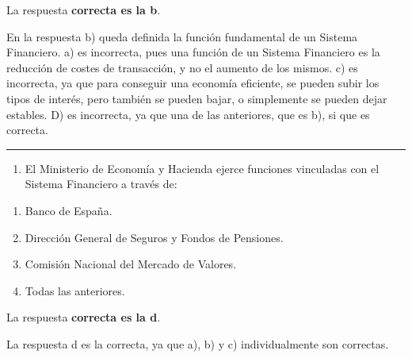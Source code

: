 \documentclass[
  letterpaper,
  DIV=11,
  numbers=noendperiod]{scrreprt}
\providecommand{\tightlist}{%
  \setlength{\itemsep}{0pt}\setlength{\parskip}{0pt}}\usepackage{longtable,booktabs,array}
\begin{document}
\begin{tcolorbox}[enhanced jigsaw, left=2mm, opacityback=0, colback=white, breakable, arc=.35mm, bottomrule=.15mm, rightrule=.15mm, toprule=.15mm, leftrule=.75mm, colframe=quarto-callout-tip-color-frame]
\begin{minipage}[t]{5.5mm}
\textcolor{quarto-callout-tip-color}{\faLightbulb}
\end{minipage}%
\begin{minipage}[t]{\textwidth - 5.5mm}

La respuesta \textbf{correcta es la b}.

En la respuesta b) queda definida la función fundamental de un Sistema
Financiero. a) es incorrecta, pues una función de un Sistema Financiero
es la reducción de costes de transacción, y no el aumento de los mismos.
c) es incorrecta, ya que para conseguir una economía eficiente, se
pueden subir los tipos de interés, pero también se pueden bajar, o
simplemente se pueden dejar estables. D) es incorrecta, ya que una de
las anteriores, que es b), si que es correcta.

\end{minipage}%
\end{tcolorbox}

\begin{center}\rule{0.5\linewidth}{0.5pt}\end{center}

\begin{enumerate}
\def\labelenumi{\arabic{enumi}.}
\setcounter{enumi}{24}
\tightlist
\item
  El Ministerio de Economía y Hacienda ejerce funciones vinculadas con
  el Sistema Financiero a través de:
\end{enumerate}

\begin{enumerate}
\def\labelenumi{\alph{enumi})}
\item
  Banco de España.
\item
  Dirección General de Seguros y Fondos de Pensiones.
\item
  Comisión Nacional del Mercado de Valores.
\item
  Todas las anteriores.
\end{enumerate}

\begin{tcolorbox}[enhanced jigsaw, left=2mm, opacityback=0, colback=white, breakable, arc=.35mm, bottomrule=.15mm, rightrule=.15mm, toprule=.15mm, leftrule=.75mm, colframe=quarto-callout-tip-color-frame]
\begin{minipage}[t]{5.5mm}
\textcolor{quarto-callout-tip-color}{\faLightbulb}
\end{minipage}%
\begin{minipage}[t]{\textwidth - 5.5mm}

La respuesta \textbf{correcta es la d}.

La respuesta d es la correcta, ya que a), b) y c) individualmente son
correctas.

\end{minipage}%
\end{tcolorbox}
\end{document}
